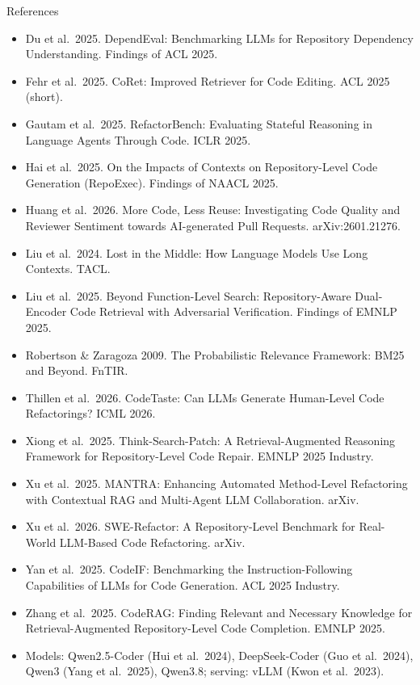 \documentclass[aspectratio=169,11pt]{beamer}
\begin{document}
\begin{frame}{References}
  \tiny
  \begin{itemize}
    \item Du et al.\ 2025. DependEval: Benchmarking LLMs for Repository Dependency Understanding. Findings of ACL 2025.
    \item Fehr et al.\ 2025. CoRet: Improved Retriever for Code Editing. ACL 2025 (short).
    \item Gautam et al.\ 2025. RefactorBench: Evaluating Stateful Reasoning in Language Agents Through Code. ICLR 2025.
    \item Hai et al.\ 2025. On the Impacts of Contexts on Repository-Level Code Generation (RepoExec). Findings of NAACL 2025.
    \item Huang et al.\ 2026. More Code, Less Reuse: Investigating Code Quality and Reviewer Sentiment towards AI-generated Pull Requests. arXiv:2601.21276.
    \item Liu et al.\ 2024. Lost in the Middle: How Language Models Use Long Contexts. TACL.
    \item Liu et al.\ 2025. Beyond Function-Level Search: Repository-Aware Dual-Encoder Code Retrieval with Adversarial Verification. Findings of EMNLP 2025.
    \item Robertson \& Zaragoza 2009. The Probabilistic Relevance Framework: BM25 and Beyond. FnTIR.
    \item Thillen et al.\ 2026. CodeTaste: Can LLMs Generate Human-Level Code Refactorings? ICML 2026.
    \item Xiong et al.\ 2025. Think-Search-Patch: A Retrieval-Augmented Reasoning Framework for Repository-Level Code Repair. EMNLP 2025 Industry.
    \item Xu et al.\ 2025. MANTRA: Enhancing Automated Method-Level Refactoring with Contextual RAG and Multi-Agent LLM Collaboration. arXiv.
    \item Xu et al.\ 2026. SWE-Refactor: A Repository-Level Benchmark for Real-World LLM-Based Code Refactoring. arXiv.
    \item Yan et al.\ 2025. CodeIF: Benchmarking the Instruction-Following Capabilities of LLMs for Code Generation. ACL 2025 Industry.
    \item Zhang et al.\ 2025. CodeRAG: Finding Relevant and Necessary Knowledge for Retrieval-Augmented Repository-Level Code Completion. EMNLP 2025.
    \item Models: Qwen2.5-Coder (Hui et al.\ 2024), DeepSeek-Coder (Guo et al.\ 2024), Qwen3 (Yang et al.\ 2025), Qwen3.8; serving: vLLM (Kwon et al.\ 2023).
  \end{itemize}
\end{frame}
\end{document}
